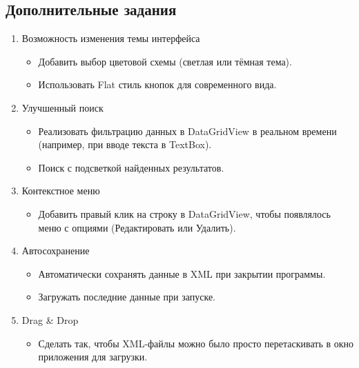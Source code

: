 \documentclass[12pt]{article}
\newcommand{\icon}[1]{\fontspec{UbuntuNerdFont}[Extension = .ttf,
  Path = /nix/store/h721jafy2n74x4k5p0hxbz722h0rncmx-nerd-fonts-ubuntu-3.3.0+0.83/share/fonts/truetype/NerdFonts/Ubuntu/,
  UprightFont = *-Regular,
BoldFont = *-Bold] #1}
\newcommand{\iicon}[1]{{\icon{#1}}}
\renewcommand{\texttt}[1]{{\small\ttfamily #1}}
\numberwithin{listing}{section}
\numberwithin{figure}{section}
\begin{document}
\newpage
\begin{center}
	\subsection
	[Дополнительные задания~\texorpdfstring{\faLightbulb}{}]
	{Дополнительные задания~\texorpdfstring{\faLightbulb}{}\protect\footnotemark}
	\begin{minipage}{0.8\linewidth}
		\begin{enumerate}[noitemsep,topsep=0pt, left=0pt]
			\item[\faStar] Возможность изменения темы интерфейса
			      \begin{itemize}
				      \item Добавить выбор цветовой схемы (светлая или тёмная тема).
				      \item Использовать \texttt{Flat} стиль кнопок для современного вида.
			      \end{itemize}
			\item[\faSearch] Улучшенный поиск
			      \begin{itemize}
				      \item Реализовать фильтрацию данных в \texttt{DataGridView} в реальном времени (например, при вводе текста в \texttt{TextBox}).
				      \item Поиск с подсветкой найденных результатов.
			      \end{itemize}
			\item[\iicon{}] Контекстное меню
			      \begin{itemize}
				      \item Добавить правый клик на строку в \texttt{DataGridView}, чтобы появлялось меню с опциями (Редактировать или Удалить).
			      \end{itemize}
			\item[\iicon{}] Автосохранение
			      \begin{itemize}
				      \item Автоматически сохранять данные в \texttt{XML} при закрытии программы.
				      \item Загружать последние данные при запуске.
			      \end{itemize}
			\item[\iicon{}] Drag \& Drop
			      \begin{itemize}
				      \item Сделать так, чтобы \texttt{XML}-файлы можно было просто перетаскивать в окно приложения для загрузки.
			      \end{itemize}

\end{enumerate}
\end{minipage}
\end{center}
\end{document}
